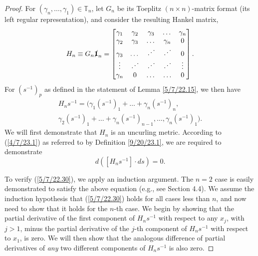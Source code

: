 \documentclass{amsart}
\numberwithin{equation}{section}
\theoremstyle{definition}
\numberwithin{theorem}{section}
\begin{document}
\begin{proof}  For $(\gamma_n,\dots,\gamma_1)\in \mathbb{T}_n$, let $G_n$ be its Toeplitz $(n\times n)$-matrix format (its left regular representation), and consider the resulting Hankel matrix, 
\begin{equation}\label{5/7/22.20} H_n \equiv G_n \slashed{\bf 1}_n = \begin{bmatrix} \gamma_1 & \gamma_2 & \gamma_3 & \dots & \gamma_n \\ \gamma_2 & \gamma_3 & \dots & \gamma_n & 0 \\ \gamma_3 & \dots & \iddots & \iddots & 0  \\ \vdots & \iddots & \iddots & \iddots & \vdots \\ \gamma_n & 0 & \dots & \ldots & 0 \end{bmatrix}.\end{equation}
For $\left( s^{-1} \right)_p$ as defined in the statement of Lemma \ref{5/7/22.15}, we then have
\begin{multline}  H_n s^{-1}   =  \Big( \gamma_1\left( s^{-1} \right)_1  + \dots + \gamma_n \left( s^{-1} \right)_n, \\ \gamma_2\left( s^{-1} \right)_1  + \dots + \gamma_n \left( s^{-1} \right)_{n-1}, 
  \dots , 
 \gamma_n \left( s^{-1} \right)_1 \Big). \label{5/7/22.40}
\end{multline}
 We will first demonstrate that $H_n$ is an uncurling metric.  According to (\ref{4/7/23.1}) as referred to by Definition \ref{9/20/23.1}, we are required to demonstrate
\begin{equation}\label{5/7/22.30} d\left([H_n s^{-1}]\cdot ds\right) = 0.\end{equation}  

To verify (\ref{5/7/22.30}), we apply an induction argument.  The $n=2$ case is easily demonstrated to satisfy the above equation (e.g., see Section 4.4).  We assume the induction hypothesis that (\ref{5/7/22.30}) holds for all cases less than $n$, and now need to show that it holds for the $n$-th case.  
We begin by showing that the partial derivative of the first component of $H_n s^{-1}$ with respect to any $x_j$, with $j>1$, minus the partial derivative of the $j$-th component of $H_n s^{-1}$ with respect to $x_1$, is zero. We will then show that the analogous difference of partial derivatives of {\it any} two different components of $H_ns^{-1}$ is also zero.


\end{proof}
\end{document}
